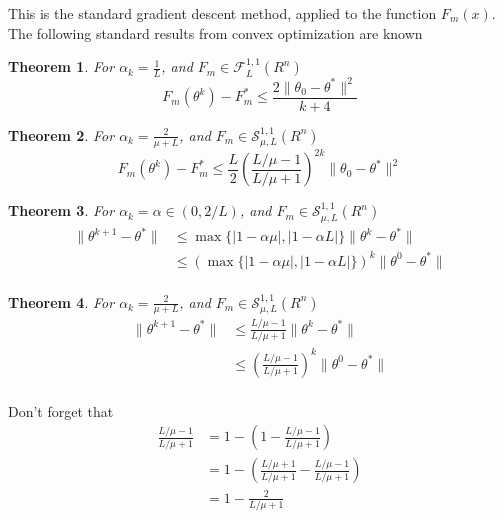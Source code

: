 \documentclass[11pt]{article}
\newtheorem{thm}{Theorem}
\begin{document}
This is the standard gradient descent method, applied to the function $F_m(x)$. The following standard results from convex optimization are known 
\begin{thm}
	\label{thm:gd1}
	For $\alpha_k = \frac{1}{L}$, and $F_{m} \in \mathcal{F}_L^{1,1} (R^n)$ 
	\begin{equation}
		F_m(\theta^{k}) - F_m^* \leq \frac{2 \|\theta_0-\theta^* \|^2}{k+4} 
	\end{equation}
\end{thm}
\begin{thm}
	\label{thm:gd2}
	For $\alpha_k = \frac{2}{\mu+L}$, and $F_{m} \in \mathcal{S}_{\mu,L}^{1,1} (R^n)$ 
	\begin{equation}
		F_m(\theta^{k}) - F_m^* \leq \frac{L}{2} \left( \frac{L/\mu-1}{L/\mu+1} \right)^{2k} \|\theta_0-\theta^* \|^2 
	\end{equation}
\end{thm}
\begin{thm}
	\label{thm:gd3}
	For $\alpha_k = \alpha  \in (0,2/L)$, and $F_{m} \in \mathcal{S}_{\mu,L}^{1,1} (R^n)$ 
	\begin{align*}
		\| \theta^{k+1} - \theta^* \|  &\leq \max \{ |1 -\alpha \mu|, |1 - \alpha L| \}\| \theta^{k} - \theta^* \| \\
		& \leq {\left(\max \{ |1 -\alpha \mu|, |1 - \alpha L| \}\right)}^{k}\| \theta^{0} - \theta^* \| \\
	\end{align*}
\end{thm}
\begin{thm}
	\label{thm:gd4}
	For $\alpha_k = \frac{2}{\mu+L}$, and $F_{m} \in \mathcal{S}_{\mu,L}^{1,1} (R^n)$ 
	\begin{align*}
		\| \theta^{k+1} - \theta^* \|  &\leq \frac{L/\mu-1}{L/\mu+1}\| \theta^{k} - \theta^* \| \\
		& \leq {\left(\frac{L/\mu-1}{L/\mu+1}\right)}^{k}\| \theta^{0} - \theta^* \| \\
	\end{align*}
\end{thm}

Don't forget that 
\begin{align*}
	\frac{L/\mu-1}{L/\mu+1} & = 1 - (1 - \frac{L/\mu-1}{L/\mu+1}) \\
	 						& = 1 - (\frac{L/\mu+1}{L/\mu+1} - \frac{L/\mu-1}{L/\mu+1}) \\
	 						& = 1 - \frac{2}{L/\mu+1}\\
\end{align*}
\end{document}
